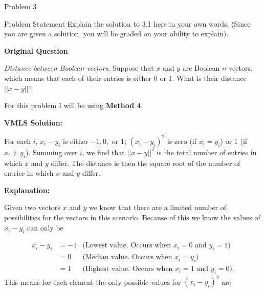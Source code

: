 \begin{problem}{Problem 3}
    \begin{statement}{Problem Statement}
        Explain the solution to 3.1 here in your own words. (Since you are given a solution, you will be graded on your ability to explain). \vspace*{1em}

        \textbf{Original Question} \vspace*{1em}

        \textit{Distance between Boolean vectors}. Suppose that $x$ and $y$ are Boolean $n$-vectors, which means that each of their entries is either 0 or 1. What is their distance $||x-y||$?
    \end{statement}

    \begin{highlight}[Solution]
        For this problem I will be using \textbf{Method 4}. \vspace*{1em}

        \textbf{VMLS Solution:} \vspace*{1em}

        For each $i$, $x_{i}-y_{i}$ is either $-1,0,$ or $1$; $(x_{i}-y_{i})^{2}$ is zero (if $x_{i} = y_{i}$) or $1$ (if $x_{i} \neq y_{i}$). Summing over $i$, we find that $||x-y||^{2}$ is the total
        number of entries in which $x$ and $y$ differ. The distance is then the square root of the number of entries in which $x$ and $y$ differ. \vspace*{1em}

        \textbf{Explanation:} \vspace*{1em}

        Given two vectors $x$ and $y$ we know that there are a limited number of possibilities for the vectors in this scenario. Because of this we know the values of $x_{i} - y_{i}$ can only be

        \setcounter{equation}{0}
        \begin{align}
            x_{i} - y_{i} & = -1 & \text{(Lowest value. Occurs when $x_{i} = 0$ and $y_{i} = 1$)} \\
            & = 0 & \text{(Median value. Occurs when $x_{i} = y_{i}$)} \\
            & = 1 & \text{(Highest value. Occurs when $x_{i} = 1$ and $y_{i} = 0$)}.
        \end{align}
        This means for each element the only possible values for $(x_{i} - y_{i})^{2}$ are 


\end{highlight}
\end{problem}
